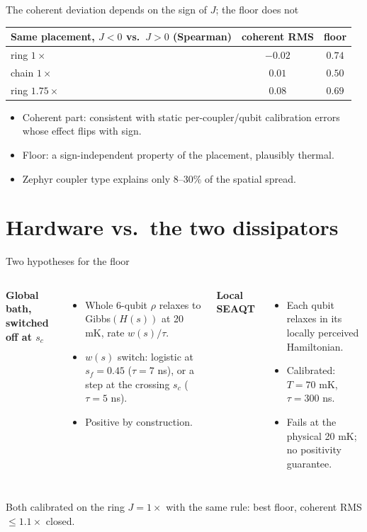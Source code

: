 \documentclass[aspectratio=169,11pt]{beamer}
\begin{document}
\begin{frame}{The coherent deviation depends on the sign of $J$; the floor does not}
  \centering
  \begin{tabular}{@{}lcc@{}}
    \toprule
    Same placement, $J<0$ vs.\ $J>0$ (Spearman) & coherent RMS & floor \\
    \midrule
    ring $1\times$     & $-0.02$ & $0.74$ \\
    chain $1\times$    & $0.01$  & $0.50$ \\
    ring $1.75\times$  & $0.08$  & $0.69$ \\
    \bottomrule
  \end{tabular}
  \vspace{1em}

  \raggedright
  \begin{itemize}
    \item Coherent part: consistent with static per-coupler/qubit calibration errors whose effect flips with sign.
    \item Floor: a sign-independent property of the placement, plausibly thermal.
    \item Zephyr coupler type explains only $8$--$30\%$ of the spatial spread.
  \end{itemize}
\end{frame}

\section{Hardware vs.\ the two dissipators}

\begin{frame}{Two hypotheses for the floor}
  \begin{columns}[T]
    \textbf{Global bath, switched off at $s_c$}
    \begin{itemize}
      \item Whole 6-qubit $\rho$ relaxes to Gibbs$(H(s))$ at 20 mK, rate $w(s)/\tau$.
      \item $w(s)$ switch: logistic at $s_f=0.45$ ($\tau=7$ ns), or a step at the crossing $s_c$ ($\tau=5$ ns).
      \item Positive by construction.
    \end{itemize}
    \textbf{Local SEAQT}
    \begin{itemize}
      \item Each qubit relaxes in its locally perceived Hamiltonian.
      \item Calibrated: $T=70$ mK, $\tau=300$ ns.
      \item Fails at the physical 20 mK; no positivity guarantee.
    \end{itemize}
  \end{columns}
  \vspace{1em}
  Both calibrated on the ring $J=1\times$ with the same rule: best floor, coherent RMS $\le 1.1\times$ closed.
\end{frame}
\end{document}
